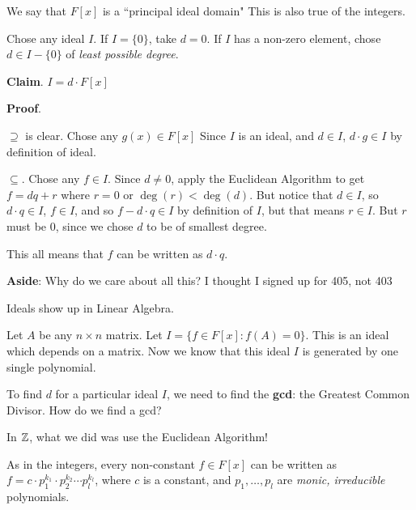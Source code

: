 \documentclass[12pt]{article}
\begin{document}
  {
    We say that $F[x]$ is a ``principal ideal domain"  This is also true of the integers.

    Chose any ideal $I$. If $I = \{0\}$, take $d = 0$. If $I$ has a non-zero
    element, chose $d \in I - \{0\}$ of {\it least possible degree}.

    {\bf Claim}. $I = d \cdot F[x]$

    {\bf Proof}.

    $\supseteq$ is clear. Chose any $g(x) \in F[x]$ Since $I$ is an ideal, and
    $d \in I$, $d \cdot g \in I$ by definition of ideal.

    $\subseteq$. Chose any $f \in I$. Since $d \ne 0$, apply the Euclidean
    Algorithm to get $f = d q + r$ where $r = 0$ or $\deg(r) < \deg(d)$. But
    notice that $d \in I$, so $d \cdot q \in I$, $f \in I$, and so $f - d \cdot
    q \in I$ by definition of $I$, but that means $r \in I$. But $r$ must be
    $0$, since we chose $d$ to be of smallest degree.

    This all means that $f$ can be written as $d \cdot q$.
  }

  {\bf Aside}: Why do we care about all this? I thought I signed up for 405, not
  403

  Ideals show up in Linear Algebra.

  Let $A$ be any $n \times n$ matrix. Let $I = \{f \in F[x] : f(A) = 0\}$. This
  is an ideal which depends on a matrix. Now we know that this ideal $I$ is
  generated by one single polynomial.


  To find $d$ for a particular ideal $I$, we need to find the {\bf gcd}: the
  Greatest Common Divisor. How do we find a gcd?

  In ${\mathbb Z}$, what we did was use the Euclidean Algorithm!


  As in the integers, every non-constant $f \in F[x]$ can be written as $f = c
  \cdot p_1^{k_1} \cdot p_2^{k_2} \cdots p_l^{k_l}$, where $c$ is a constant,
  and $p_1, \dots, p_l$ are {\it monic, irreducible} polynomials.
\end{document}
